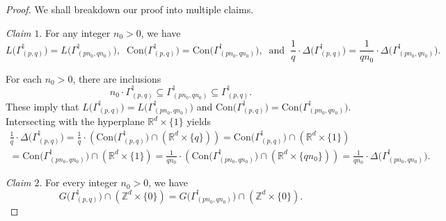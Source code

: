 \documentclass[12pt,a4paper]{amsart}
\theoremstyle{plain}
\theoremstyle{definition}
\numberwithin{equation}{theorem}
\begin{document}
\begin{proof} We shall breakdown our proof into multiple claims.

\vspace{0.2cm}
\noindent
\emph{Claim $1$}. For any integer $n_0>0$, we have
\begin{equation*}
L\big(\Gamma^{\mathbb{I}}_{(p,q)}\big) = L\big(\Gamma^{\mathbb{I}}_{(pn_0,qn_0)}\big),\;\; \mathrm{Con}\big(\Gamma^{\mathbb{I}}_{(p,q)}\big) = \mathrm{Con}\big(\Gamma^{\mathbb{I}}_{(pn_0,qn_0)}\big), \;\; \text{and} \;\; \frac{1}{q}\cdot\Delta\big(\Gamma^{\mathbb{I}}_{(p,q)}\big) = \frac{1}{qn_0}\cdot\Delta\big(\Gamma^{\mathbb{I}}_{(pn_0,qn_0)}\big).
\end{equation*}

For each $n_0>0$, there are inclusions $$n_0 \cdot \Gamma^{\mathbb{I}}_{(p,q)} \subseteq \Gamma^{\mathbb{I}}_{(pn_0,qn_0)} \subseteq \Gamma^{\mathbb{I}}_{(p,q)}.$$ These imply that $L\big(\Gamma^{\mathbb{I}}_{(p,q)}\big) = L\big(\Gamma^{\mathbb{I}}_{(pn_0,qn_0)}\big)$ and $\mathrm{Con}\big(\Gamma^{\mathbb{I}}_{(p,q)}\big) = \mathrm{Con}\big(\Gamma^{\mathbb{I}}_{(pn_0,qn_0)}\big)$. Intersecting with the hyperplane $\mathbb{R}^d\times \{1\}$ yields
\begin{multline*}
 \frac{1}{q}\cdot\Delta\big(\Gamma^{\mathbb{I}}_{(p,q)}\big) = \frac{1}{q}\cdot\left(\mathrm{Con}\big(\Gamma^{\mathbb{I}}_{(p,q)}\big) \cap \left(\mathbb{R}^d\times \{q\}\right)\right) = \mathrm{Con}\big(\Gamma^{\mathbb{I}}_{(p,q)}\big) \cap \left(\mathbb{R}^d\times \{1\}\right)\\ =\mathrm{Con}\big(\Gamma^{\mathbb{I}}_{(pn_0,qn_0)}\big) \cap \left(\mathbb{R}^d\times \{1\}\right) = \frac{1}{qn_0}\cdot\left(\mathrm{Con}\big(\Gamma^{\mathbb{I}}_{(pn_0,qn_0)}\big) \cap \left(\mathbb{R}^d\times \{qn_0\}\right)\right) = \frac{1}{qn_0}\cdot\Delta\big(\Gamma^{\mathbb{I}}_{(pn_0,qn_0)}\big).
\end{multline*}

\vspace{0.2cm}
\noindent
\emph{Claim $2$}. For every integer $n_0>0$, we have
\begin{equation*}
G\big(\Gamma^{\mathbb{I}}_{(p,q)}\big) \cap \left(\mathbb{Z}^d\times \{0\}\right) = G\big(\Gamma^{\mathbb{I}}_{(pn_0,qn_0)}\big) \cap \left(\mathbb{Z}^d\times \{0\}\right).
\end{equation*}


\end{proof}
\end{document}

